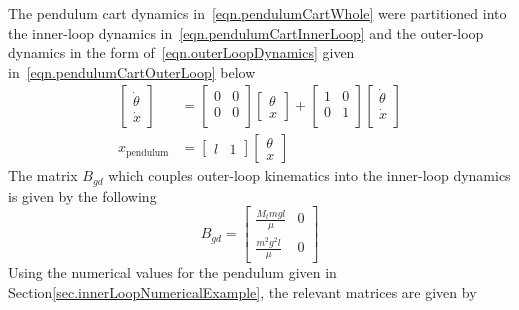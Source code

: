 The pendulum cart dynamics in\ \eqref{eqn.pendulumCartWhole} were partitioned into the inner-loop dynamics in\ \eqref{eqn.pendulumCartInnerLoop} and the outer-loop dynamics in the form of\ \eqref{eqn.outerLoopDynamics} given in\ \eqref{eqn.pendulumCartOuterLoop} below
\begin{equation}
  \label{eqn.pendulumCartOuterLoop}
  \begin{split}
    \begin{bmatrix}
      \dot{\theta} \\
      \dot{x}
    \end{bmatrix}
    &=
    \begin{bmatrix}
      0 & 0 \\
      0 & 0 \\
    \end{bmatrix}
    \begin{bmatrix}
      \theta \\
      x
    \end{bmatrix}
    +
    \begin{bmatrix}
      1 & 0 \\
      0 & 1 \\
    \end{bmatrix}
    \begin{bmatrix}
      \dot{\theta} \\
      \dot{x} \\
    \end{bmatrix} \\
    x_{\text{pendulum}}
    &=
    \begin{bmatrix}
      l & 1
    \end{bmatrix}
    \begin{bmatrix}
      \theta \\
      x
    \end{bmatrix}
  \end{split}
\end{equation}
The matrix $B_{gd}$ which couples outer-loop kinematics into the inner-loop dynamics is given by the following
\begin{equation*}
  B_{gd}
  =
  \begin{bmatrix}
    \frac{M_{t}mgl}{\mu} & 0 \\
    \frac{m^{2}g^{2}l}{\mu} & 0
  \end{bmatrix}
\end{equation*}
Using the numerical values for the pendulum given in Section\ref{sec.innerLoopNumericalExample}, the relevant matrices are given by

